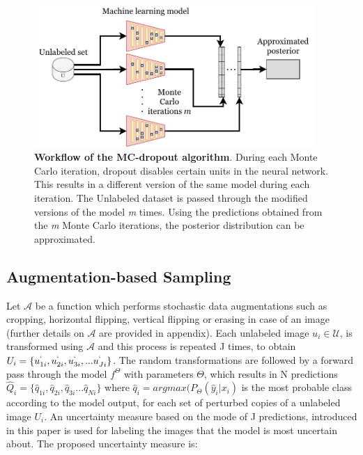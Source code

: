 \begin{figure}[htbp]
\centering
\captionsetup{format=plain}
\includegraphics[keepaspectratio,width=0.95\textwidth]{figures/fig_mc_dropout.pdf}
\caption[Workflow of the MC-dropout algorithm]{\textbf{Workflow of the MC-dropout algorithm}. During each Monte Carlo iteration, dropout disables certain units in the neural network. This results in a different version of the same model during each iteration. The Unlabeled dataset is passed through the modified versions of the model \textit{m} times. Using the predictions obtained from the \textit{m} Monte Carlo iterations, the posterior distribution can be approximated.}
\label{fig:mc_dropout}
\end{figure}

\subsection{Augmentation-based Sampling}
Let $\mathcal{A}$ be a function which performs stochastic data augmentations such as cropping, horizontal flipping, vertical flipping or erasing in case of an image (further details on $\mathcal{A}$ are provided in appendix). Each unlabeled image $u_i\in\mathcal{U}$, is transformed using $\mathcal{A}$ and this process is repeated J times, to obtain $U_i = \{u_{1i}^{`}, u_{2i}^{`}, u^{`}_{3i}, ... u_{Ji}^{`}\}$. The random transformations are followed by a forward pass through the model $f^\Theta$ with parameters $\Theta$, which results in N predictions $\hat{Q}_i = \{\hat{q}_{1i}, \hat{q}_{2i}, \hat{q}_{3i} ... \hat{q}_{Ni}\}$ where $\hat{q}_i = argmax(P_\Theta(\hat{y}_i|x_i)$ is the most probable class according to the model output, for each set of perturbed copies of a unlabeled image $U_i$. An uncertainty measure based on the mode of J predictions, introduced in this paper \cite{sadafi2019} is used for labeling the images that the model is most uncertain about. The proposed uncertainty measure is:

